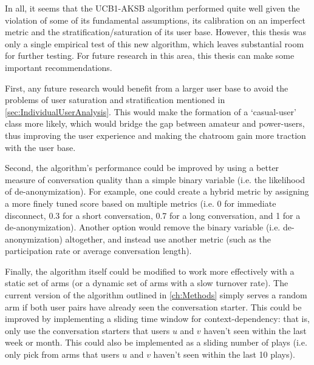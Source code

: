 In all, it seems that the UCB1-AKSB algorithm performed quite well given the violation of some of its fundamental assumptions, its calibration on an imperfect metric and the stratification/saturation of its user base. However, this thesis was only a single empirical test of this new algorithm, which leaves substantial room for further testing. For future research in this area, this thesis can make some important recommendations.

First, any future research would benefit from a larger user base to avoid the problems of user saturation and stratification mentioned in \autoref{sec:IndividualUserAnalysis}. This would make the formation of a `casual-user' class more likely, which would bridge the gap between amateur and power-users, thus improving the user experience and making the chatroom gain more traction with the user base.

Second, the algorithm's performance could be improved by using a better measure of conversation quality than a simple binary variable (i.e. the likelihood of de-anonymization). For example, one could create a hybrid metric by assigning a more finely tuned score based on multiple metrics (i.e. 0 for immediate disconnect, 0.3 for a short conversation, 0.7 for a long conversation, and 1 for a de-anonymization). Another option would remove the binary variable (i.e. de-anonymization) altogether, and instead use another metric (such as the participation rate or average conversation length). 

Finally, the algorithm itself could be modified to work more effectively with a static set of arms (or a dynamic set of arms with a slow turnover rate). The current version of the algorithm outlined in \autoref{ch:Methods} simply serves a random arm if both user pairs have already seen the conversation starter. This could be improved by implementing a sliding time window for context-dependency: that is, only use the conversation starters that users $u$ and $v$ haven't seen within the last week or month. This could also be implemented as a sliding number of plays (i.e. only pick from arms that users $u$ and $v$ haven't seen within the last 10 plays).

